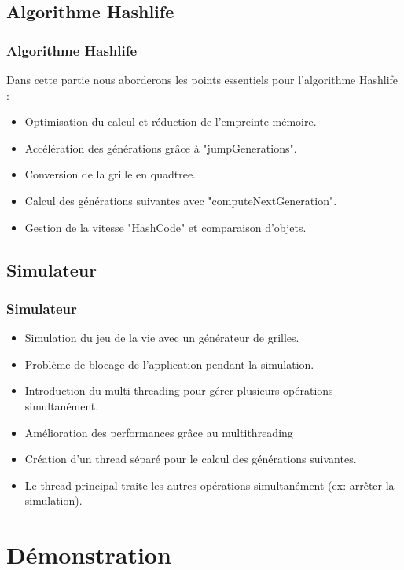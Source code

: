 \documentclass{beamer}
\begin{document}
\subsection{Algorithme Hashlife}
\begin{frame}
  \frametitle{Algorithme Hashlife}
  
  Dans cette partie nous aborderons les points essentiels pour l'algorithme Hashlife : 
  
 \begin{itemize}
 \item Optimisation du calcul et réduction de l'empreinte mémoire.
 \item Accélération des générations grâce à "jumpGenerations".
 \item Conversion de la grille en quadtree.
 \item Calcul des générations suivantes avec "computeNextGeneration".
 \item Gestion de la vitesse "HashCode" et comparaison d'objets.
 \end{itemize}
\end{frame}

\subsection{Simulateur}
\begin{frame}
  \frametitle{Simulateur}
 \begin{itemize}
 \item Simulation du jeu de la vie avec un générateur de grilles.
 \item Problème de blocage de l'application pendant la simulation.
 \item Introduction du multi threading pour gérer plusieurs opérations simultanément.
 \item Amélioration des performances grâce au multithreading
 \item Création d'un thread séparé pour le calcul des générations suivantes.
 \item Le thread principal traite les autres opérations simultanément (ex: arrêter la simulation).
 \end{itemize}
\end{frame}

\section{Démonstration}
\end{document}
